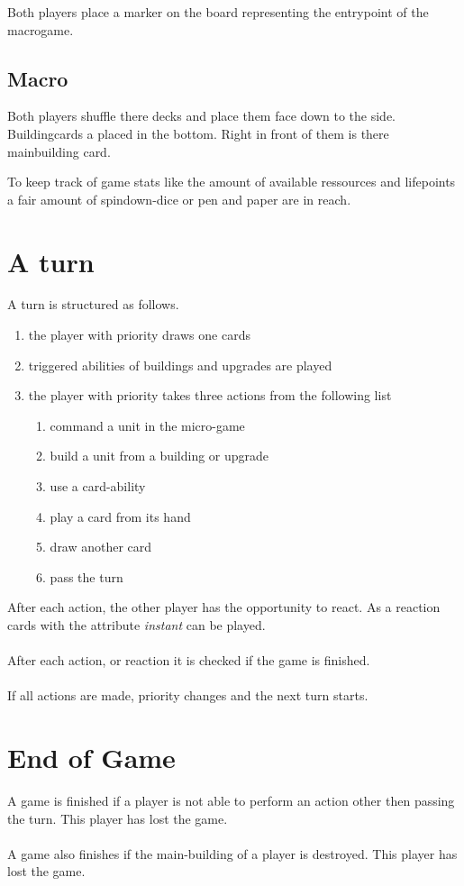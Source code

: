 \documentclass[a5paper,pagesize,10pt,bibtotoc,pointlessnumbers,
normalheadings,DIV=9,twoside=false]{scrbook}
\begin{document}
Both players place a marker on the board representing the entrypoint of the macrogame.

\subsection{Macro}
Both players shuffle there decks and place them face down to the side. Buildingcards a placed in the bottom. Right in front of them is there mainbuilding card.

To keep track of game stats like the amount of available ressources and lifepoints a fair amount of spindown-dice or pen and paper are in reach.

\section{A turn}
A turn is structured as follows.

\begin{enumerate}
\item the player with priority draws one cards
\item triggered abilities of buildings and upgrades are played
\item the player with priority takes three actions from the following list
\begin{enumerate}
\item command a unit in the micro-game
\item build a unit from a building or upgrade
\item use a card-ability
\item play a card from its hand
\item draw another card
\item pass the turn
\end{enumerate}
\end{enumerate}

After each action, the other player has the opportunity to react. As a reaction cards with the attribute \emph{instant} can be played.\\
\\
After each action, or reaction it is checked if the game is finished.\\
\\
If all actions are made, priority changes and the next turn starts.

\section{End of Game}
A game is finished if a player is not able to perform an action other then passing the turn. This player has lost the game.\\
\\
A game also finishes if the main-building of a player is destroyed. This player has lost the game.
\end{document}
